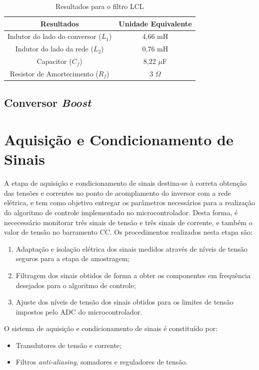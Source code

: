 \begin{table}[h]
	\centering
	\caption{Resultados para o filtro LCL}
	\label{tab:resultados-filtro-lcl}
	
	\begin{tabular}{cc}
		\toprule
		\textbf{Resultados} & \textbf{Unidade Equivalente} \\
		\midrule
		Indutor do lado do conversor ($L_1$) & 4,66 mH \\
		Indutor do lado da rede ($L_2$) & 0,76 mH \\
		Capacitor ($C_f$) & 8,22 $\mu$F \\
		Resistor de Amortecimento ($R_f$) & 3 $\Omega$ \\
		\bottomrule
	\end{tabular}
\end{table}

\subsection{Conversor \textit{Boost}}

\section{Aquisição e Condicionamento de Sinais}

A etapa de aquisição e condicionamento de sinais destina-se à correta obtenção das tensões e correntes no ponto de acomplamento do inversor com a rede elétrica, e tem como objetivo entregar os parâmetros necessários para a realização do algoritmo de controle implementado no microcontrolador.
Desta forma, é nececessário monitorar três sinais de tensão e três sinais de corrente, e também o valor de tensão no barramento CC.
Os procedimentos realizados nesta etapa são:
\begin{enumerate}
	\item Adaptação e isolação elétrica dos sinais medidos através de níveis de tensão seguros para a etapa de amostragem;
	\item Filtragem dos sinais obtidos de forma a obter os componentes em frequência desejados para o algoritmo de controle;
	\item Ajuste dos níveis de tensão dos sinais obtidos para os limites de tensão impostos pelo ADC do microcontrolador.
\end{enumerate}

O sistema de aquisição e condicionamento de sinais é constituído por:

\begin{itemize}
	\item Transdutores de tensão e corrente;
	\item Filtros \textit{anti-aliasing}, somadores e reguladores de tensão.
\end{itemize}

